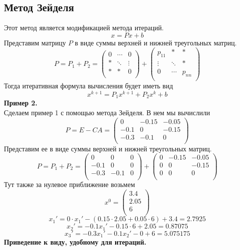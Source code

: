 \documentclass[12pt]{article}
\begin{document}
	\subsection{Метод Зейделя}
	Этот метод является модификацией метода итераций. 
	$$x=Px+b$$
	Представим матрицу $P$ в виде суммы верхней и нижней треугольных матриц.
	\[P=P_1+P_2= \begin{pmatrix}
	0 & \cdots & 0\\
	* & \ddots & \vdots\\
	* & * & 0\\
	\end{pmatrix} + \begin{pmatrix}
	p_{11} & * & *\\
	\vdots & \ddots & *\\
	0 & \cdots & p_{nn}\\
	\end{pmatrix}\]
	Тогда итеративная формула вычисления будет иметь вид
	$$x^{k+1}=P_1x^{k+1}+P_2x^k+b$$
	\textbf{Пример 2.}\\
	Сделаем пример 1 с помощью метода Зейделя. В нем мы вычислили
	\[P=E-CA=\begin{pmatrix}
	0 & -0.15 & -0.05\\
	-0.1 & 0 & -0.15\\
	-0.3 & -0.1 & 0\\
	\end{pmatrix}\]
	Представим ее в виде суммы верхней и нижней треугольных матриц.
	\[P=P_1+P_2=\begin{pmatrix}
	0 & 0 & 0\\
	-0.1 & 0 & 0\\
	-0.3 & -0.1 & 0\\
	\end{pmatrix} + \begin{pmatrix}
	0 & -0.15 & -0.05\\
	0 & 0 & -0.15\\
	0 & 0 & 0\\
	\end{pmatrix}\]
	Тут также за нулевое приближение возьмем
	\[x^0=\begin{pmatrix}
	3.4\\
	2.05\\
	6\\
	\end{pmatrix}\]
	$$x_1'=0\cdot x_1'-(0.15\cdot 2.05+0.05\cdot 6)+3.4=2.7925$$
	$$x_2'=-0.1x_1'-0.15\cdot 6+2.05=0.87075$$
	$$x_3'=-0.3x_1'-0.1x_2'-0+6=5.075175$$
	\textbf{Приведение к виду, удобному для итераций.}\\
\end{document}
